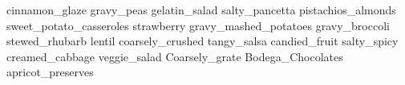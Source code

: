 cinnamon\_glaze gravy\_peas gelatin\_salad salty\_pancetta pistachios\_almonds sweet\_potato\_casseroles strawberry gravy\_mashed\_potatoes gravy\_broccoli stewed\_rhubarb lentil coarsely\_crushed tangy\_salsa candied\_fruit salty\_spicy creamed\_cabbage veggie\_salad Coarsely\_grate Bodega\_Chocolates apricot\_preserves 
